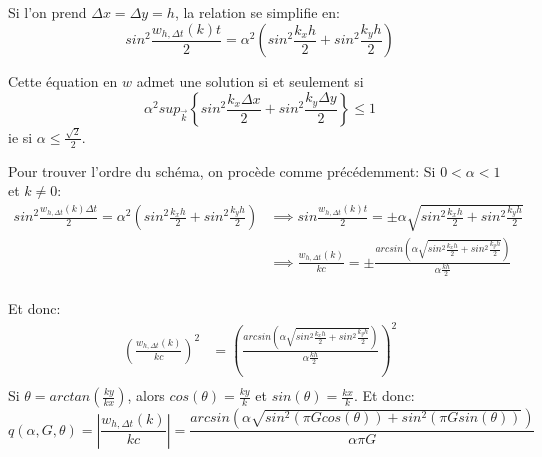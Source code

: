\documentclass{article}
\newcommand{\BigF}[2]{\ensuremath{#1 \left(#2\right)}}
\newcommand{\Wrap}[1]{\ensuremath{\left(#1\right)}}
\begin{document}
Si l'on prend $\Delta x = \Delta y = h$, la relation se simplifie en:
$$ sin^2 \frac{w_{h, \Delta t} (k) t}{2} = \alpha ^ 2 \Wrap{ sin^2 \frac{k_x h}{2} + sin^2 \frac{k_y h}{2} }$$

Cette équation en $w$ admet une solution si et seulement si 
$$\alpha ^ 2 sup_{\vec{k}} \left\{ sin^2 \frac{k_x \Delta x}{2} + sin^2 \frac{k_y \Delta y}{2} \right \} \leq 1$$
ie si $\alpha \leq \frac{\sqrt{2}}{2}$.

Pour trouver l'ordre du schéma, on procède comme précédemment:
Si $ 0 < \alpha < 1 $ et $ k \neq 0 $:
\begin{align*}
sin^2 \frac{w_{h, \Delta t} (k) \Delta t}{2} = \alpha ^ 2 \Wrap{sin^2 \frac{k_x h}{2} + sin^2 \frac{k_y h}{2}}
& \implies sin \frac{w_{h, \Delta t} (k) t}{2} = \pm \alpha  \sqrt{sin^2 \frac{k_x h}{2} + sin^2 \frac{k_y h}{2}}  \\
& \implies \frac{w_{h, \Delta t} (k)}{k c} = \pm \frac{ \BigF{arcsin}{\alpha  \sqrt{sin^2 \frac{k_x h}{2} + sin^2 \frac{k_y h}{2}} }}{ \alpha \frac{k h}{2} }\\
\end{align*}

Et donc:
\begin{align*}
\Wrap{ \frac{w_{h, \Delta t} (k)}{k c} }^2
&= \Wrap{\frac{\BigF{arcsin}{\alpha  \sqrt{sin^2 \frac{k_x h}{2} + sin^2 \frac{k_y h}{2}} }}{ \alpha \frac{k h}{2} } }^2 \\
\end{align*}
Si $\theta = arctan(\frac{ky}{kx})$, alors $cos(\theta) = \frac{ky}{k}$ et $sin(\theta) = \frac{kx}{k}$. Et donc:
$$ q(\alpha, G, \theta) = |\frac{w_{h,\Delta t}(k)}{kc}| 
= \frac{ \BigF{arcsin}{\alpha  \sqrt{sin^2(\pi G cos(\theta) )  + sin^2(\pi G sin(\theta) )} }}{ \alpha \pi G }$$
\end{document}
